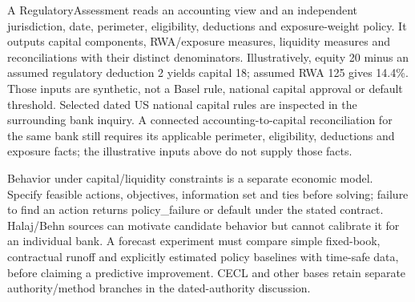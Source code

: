 

A RegulatoryAssessment reads an accounting view and an independent jurisdiction, date, perimeter, eligibility, deductions and exposure-weight policy. It outputs capital components, RWA/exposure measures, liquidity measures and reconciliations with their distinct denominators. Illustratively, equity 20 minus an assumed regulatory deduction 2 yields capital 18; assumed RWA 125 gives 14.4\%. Those inputs are synthetic, not a Basel rule, national capital approval or default threshold. Selected dated US national capital rules are inspected in the surrounding bank inquiry. A connected accounting-to-capital reconciliation for the same bank still requires its applicable perimeter, eligibility, deductions and exposure facts; the illustrative inputs above do not supply those facts.

Behavior under capital/liquidity constraints is a separate economic model. Specify feasible actions, objectives, information set and ties before solving; failure to find an action returns policy\_failure or default under the stated contract. Halaj/Behn sources can motivate candidate behavior but cannot calibrate it for an individual bank. A forecast experiment must compare simple fixed-book, contractual runoff and explicitly estimated policy baselines with time-safe data, before claiming a predictive improvement. CECL and other bases retain separate authority/method branches in the dated-authority discussion.
